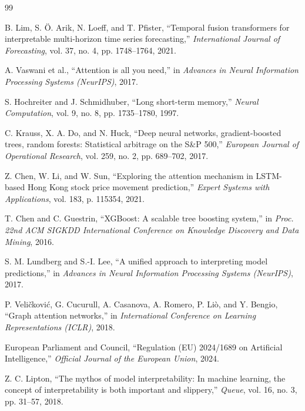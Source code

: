 \documentclass[conference]{IEEEtran}
\begin{document}

\begin{thebibliography}{99}

B. Lim, S. Ö. Arik, N. Loeff, and T. Pfister, ``Temporal fusion transformers for interpretable multi-horizon time series forecasting,'' \textit{International Journal of Forecasting}, vol. 37, no. 4, pp. 1748--1764, 2021.

A. Vaswani et al., ``Attention is all you need,'' in \textit{Advances in Neural Information Processing Systems (NeurIPS)}, 2017.

S. Hochreiter and J. Schmidhuber, ``Long short-term memory,'' \textit{Neural Computation}, vol. 9, no. 8, pp. 1735--1780, 1997.

C. Krauss, X. A. Do, and N. Huck, ``Deep neural networks, gradient-boosted trees, random forests: Statistical arbitrage on the S\&P 500,'' \textit{European Journal of Operational Research}, vol. 259, no. 2, pp. 689--702, 2017.

Z. Chen, W. Li, and W. Sun, ``Exploring the attention mechanism in LSTM-based Hong Kong stock price movement prediction,'' \textit{Expert Systems with Applications}, vol. 183, p. 115354, 2021.

T. Chen and C. Guestrin, ``XGBoost: A scalable tree boosting system,'' in \textit{Proc. 22nd ACM SIGKDD International Conference on Knowledge Discovery and Data Mining}, 2016.

S. M. Lundberg and S.-I. Lee, ``A unified approach to interpreting model predictions,'' in \textit{Advances in Neural Information Processing Systems (NeurIPS)}, 2017.

P. Veličković, G. Cucurull, A. Casanova, A. Romero, P. Liò, and Y. Bengio, ``Graph attention networks,'' in \textit{International Conference on Learning Representations (ICLR)}, 2018.

European Parliament and Council, ``Regulation (EU) 2024/1689 on Artificial Intelligence,'' \textit{Official Journal of the European Union}, 2024.

Z. C. Lipton, ``The mythos of model interpretability: In machine learning, the concept of interpretability is both important and slippery,'' \textit{Queue}, vol. 16, no. 3, pp. 31--57, 2018.


\end{thebibliography}
\end{document}

